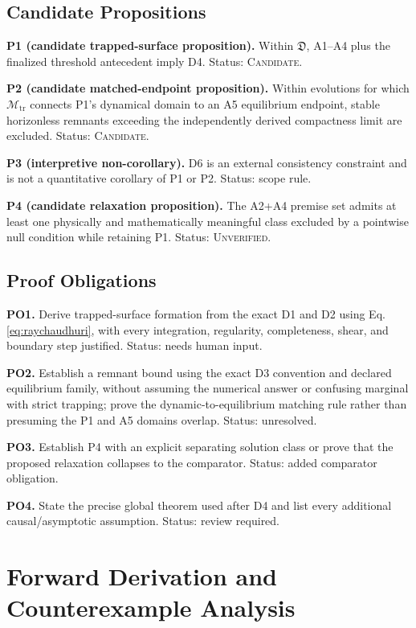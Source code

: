 \documentclass[conference]{IEEEtran}
\newcommand{\Unverified}{\textsc{Unverified}}
\newcommand{\Candidate}{\textsc{Candidate}}
\begin{document}
\subsection{Candidate Propositions}
\textbf{P1 (candidate trapped-surface proposition).} Within $\mathfrak{D}$, A1--A4 plus the finalized threshold antecedent imply D4. Status: \Candidate.

\textbf{P2 (candidate matched-endpoint proposition).} Within evolutions for which $\mathcal{M}_{\mathrm{tr}}$ connects P1's dynamical domain to an A5 equilibrium endpoint, stable horizonless remnants exceeding the independently derived compactness limit are excluded. Status: \Candidate.

\textbf{P3 (interpretive non-corollary).} D6 is an external consistency constraint and is not a quantitative corollary of P1 or P2. Status: scope rule.

\textbf{P4 (candidate relaxation proposition).} The A2+A4 premise set admits at least one physically and mathematically meaningful class excluded by a pointwise null condition while retaining P1. Status: \Unverified.

\subsection{Proof Obligations}
\textbf{PO1.} Derive trapped-surface formation from the exact D1 and D2 using Eq. \eqref{eq:raychaudhuri}, with every integration, regularity, completeness, shear, and boundary step justified. Status: needs human input.

\textbf{PO2.} Establish a remnant bound using the exact D3 convention and declared equilibrium family, without assuming the numerical answer or confusing marginal with strict trapping; prove the dynamic-to-equilibrium matching rule rather than presuming the P1 and A5 domains overlap. Status: unresolved.

\textbf{PO3.} Establish P4 with an explicit separating solution class or prove that the proposed relaxation collapses to the comparator. Status: added comparator obligation.

\textbf{PO4.} State the precise global theorem used after D4 and list every additional causal/asymptotic assumption. Status: review required.

\section{Forward Derivation and Counterexample Analysis}
\label{sec:derivation}
\end{document}

